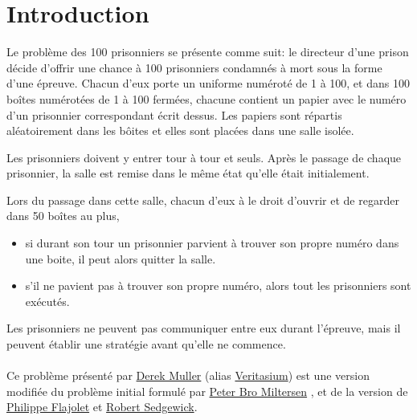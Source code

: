 \section{Introduction}

Le problème des 100 prisonniers \cite{100PrisonersProblem2023} se présente
comme suit:
le directeur d'une prison décide d'offrir une chance à 100 prisonniers
condamnés à mort sous la forme d'une épreuve.
Chacun d'eux porte un uniforme numéroté de 1 à 100, et dans 100 boîtes
numérotées de 1 à 100 fermées, chacune contient un papier avec le numéro d'un
prisonnier correspondant écrit dessus.
Les papiers sont répartis aléatoirement dans les bôites et elles sont placées dans une
salle isolée.

Les prisonniers doivent y entrer tour à tour et seuls.
Après le passage de chaque prisonnier, la salle est remise dans le même
état qu'elle était initialement.

Lors du passage dans cette salle, chacun d'eux à le droit d'ouvrir
et de regarder dans 50 boîtes au plus,

\begin{itemize}
	\item
	      si durant son tour un prisonnier parvient à trouver son propre numéro
	      dans une boite, il peut alors quitter la salle.
	\item
	      s'il ne pavient pas à trouver son propre numéro, alors tout les
	      prisonniers sont exécutés.
\end{itemize}

Les prisonniers ne peuvent pas communiquer entre eux durant l'épreuve,
mais il peuvent établir une stratégie avant qu'elle ne commence.\\\\
Ce problème présenté \cite{veritasiumRiddleThatSeems2022} par
\href{https://fr.wikipedia.org/wiki/Derek_Muller}{Derek Muller}
(alias \href{https://www.youtube.com/@veritasium}{Veritasium})
est une version modifiée du problème
initial \cite{miltersenCellProbeComplexity2007} formulé par
\href{https://pure.au.dk/portal/en/persons/bromille%40cs.au.dk}{Peter Bro Miltersen}
, et de la version \cite{flajoletAnalyticCombinatorics2009} de
\href{https://fr.wikipedia.org/wiki/Philippe_Flajolet}{Philippe Flajolet}
et \href{https://en.wikipedia.org/wiki/Robert_Sedgewick_(computer_scientist)}{Robert Sedgewick}.
